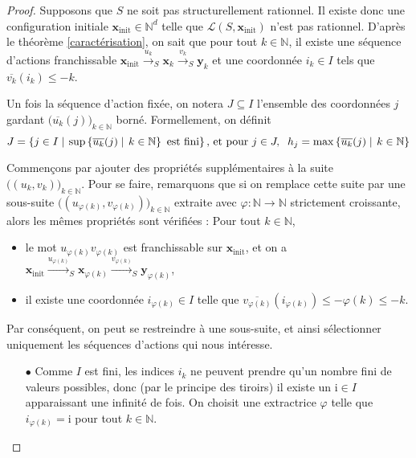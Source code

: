 \documentclass[a4paper,final]{article}
\theoremstyle{definition}
\let\phi\varphi
\let\leq\leqslant
\newcommand{\alain}[1]{\textcolor{blue}{#1}}
\newcommand{\set}[2]{\left\{#1\mathrel{\left|\vphantom{#1}\vphantom{#2}\right.}#2\right\}}
\newcommand{\N}{\ensuremath{\mathbb{N}}}
\newcommand{\lang}{\ensuremath{\mathcal{L}}}
\newcommand{\trans}[2]{\ensuremath{\stackrel{#1}{\longrightarrow}_{#2}}}
\newcommand{\vect}[1]{\ensuremath{\mathbf{#1}}}
\newcommand{\xinit}{\ensuremath{\vect{x}_\text{init}}}
\newcommand{\valeur}[1]{\ensuremath{\overline{#1}}}
\begin{document}
\begin{proof}
Supposons que $S$ ne soit pas structurellement rationnel.
Il existe donc une configuration initiale $\xinit \in\N^d$ telle que $\lang(S,\xinit)$ n'est pas rationnel.
D'après le théorème \ref{caractérisation}, on sait que pour tout $k\in\N$,  il existe une séquence d'actions franchissable 
$\xinit \trans{u_k}{S} \vect{x}_k \trans{v_k}{S} \vect{y}_k$
et une coordonnée $i_k \in I$ tels que $\valeur{v_k}(i_k) \leq -k$.

Un fois la séquence d'action fixée, on notera $J\subseteq I$ l'ensemble des coordonnées $j$ gardant $\big( \valeur{u_k}(j) \big)_{k\in\N}$ borné.
Formellement, on définit 
$$J = \set{j\in I}{
    \text{sup} \set{\valeur{u_k}(j)}{k\in\N} \text{ est fini}}
\text{, et pour } j\in J,\hspace{2mm} h_j = \max \set{\valeur{u_k}(j)}{k\in\N}$$

Commençons par ajouter des propriétés supplémentaires à la suite $\big((u_k,v_k)\big)_{k\in\N}$.
Pour se faire, remarquons que si on remplace cette suite par une sous-suite $\big( (u_{\phi(k)}, v_{\phi(k)}) \big) _{k\in\N}$ extraite avec $\phi:\N\to\N$ strictement croissante, 
alors les mêmes propriétés sont vérifiées :
Pour tout $k\in\N$,
\begin{itemize}
    \item le mot $u_{\phi(k)} v_{\phi(k)}$ est franchissable sur $\xinit$, et on a $\xinit \trans{u_{\phi(k)}}{S} \vect{x}_{\phi(k)} \trans{v_{\phi(k)}}{S} \vect{y}_{\phi(k)}$,
    \item il existe une coordonnée $i_{\phi(k)} \in I$ telle que $\valeur{v_{\phi(k)}}(i_{\phi(k)}) \leq -\phi(k) \leq -k$.
\end{itemize}
Par conséquent, on peut se restreindre à une sous-suite, et ainsi sélectionner uniquement les séquences d'actions qui nous intéresse.

\begin{itemize}
    \item[$\bullet$] Comme $I$ est fini, les indices $i_k$ ne peuvent prendre qu'un nombre fini de valeurs possibles, donc (par le principe des tiroirs) il existe un $\mathrm{i}\in I$ apparaissant une infinité de fois.
    On choisit une extractrice $\phi$ telle que $i_{\phi(k)} = \mathrm{i}$ pour tout $k\in\N$.
    

\end{itemize}
\end{proof}
\end{document}
